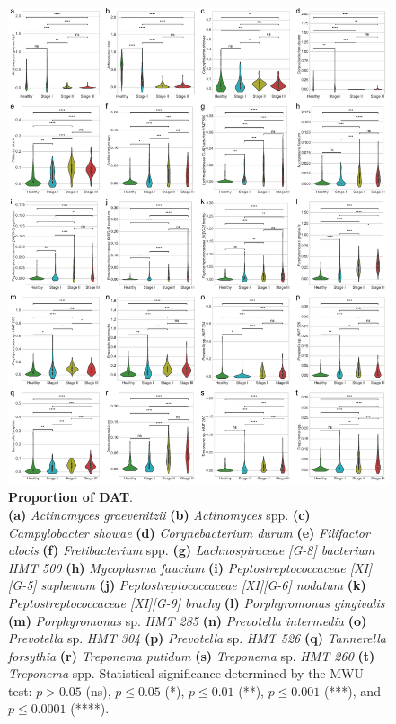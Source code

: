 \documentclass[11pt, a4paper, onecolumn, oneside]{report}
\begin{document}
            \begin{figure}[p]
                \centering
                \includegraphics[width=0.9 \linewidth]{Figures/Periodontitis/Figure_R04.pdf}
                \caption[Proportion of DAT]{\textbf{Proportion of DAT}. \\
                    \textbf{(a)} \textit{Actinomyces graevenitzii} \textbf{(b)} \textit{Actinomyces} spp. \textbf{(c)} \textit{Campylobacter showae} \textbf{(d)} \textit{Corynebacterium durum} \textbf{(e)} \textit{Filifactor alocis} \textbf{(f)} \textit{Fretibacterium} spp. \textbf{(g)} \textit{Lachnospiraceae [G-8] bacterium HMT 500} \textbf{(h)} \textit{Mycoplasma faucium} \textbf{(i)} \textit{Peptostreptococcaceae [XI][G-5] saphenum} \textbf{(j)} \textit{Peptostreptococcaceae [XI][G-6] nodatum} \textbf{(k)} \textit{Peptostreptococcaceae [XI][G-9] brachy} \textbf{(l)} \textit{Porphyromonas gingivalis} \textbf{(m)} \textit{Porphyromonas} sp. \textit{HMT 285} \textbf{(n)} \textit{Prevotella intermedia} \textbf{(o)} \textit{Prevotella} sp. \textit{HMT 304} \textbf{(p)} \textit{Prevotella} sp. \textit{HMT 526} \textbf{(q)} \textit{Tannerella forsythia} \textbf{(r)} \textit{Treponema putidum} \textbf{(s)} \textit{Treponema} sp. \textit{HMT 260} \textbf{(t)} \textit{Treponema} spp. Statistical significance determined by the MWU test: $p > 0.05$ (ns), $p \le 0.05$ (*), $p \le 0.01$ (**), $p \le 0.001$ (***), and $p \le 0.0001$ (****).}
                \label{fig:Periodontitis-proportions}
            \end{figure}
            \clearpage
\end{document}
